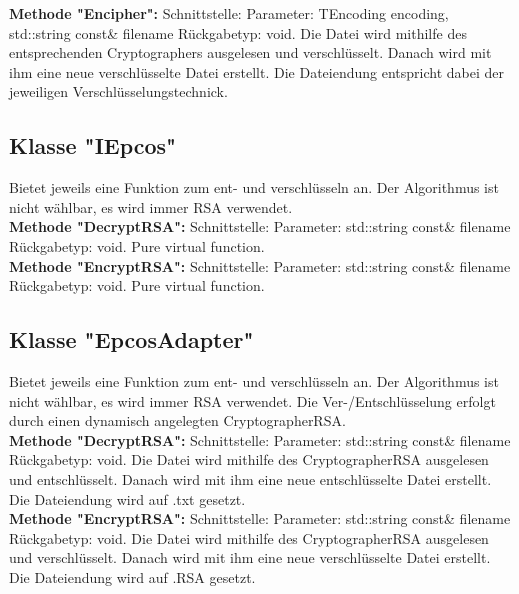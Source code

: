 \documentclass[12pt,a4paper]{article}
\begin{document}
\textbf {Methode "Encipher": } 
\newline
Schnittstelle:
Parameter: TEncoding encoding, std::string const\& filename
Rückgabetyp: void.
\newline
Die Datei wird mithilfe des entsprechenden Cryptographers ausgelesen und verschlüsselt. Danach wird mit ihm eine neue verschlüsselte Datei erstellt. Die Dateiendung entspricht dabei der jeweiligen Verschlüsselungstechnick.
\\


\subsection {Klasse "IEpcos"}
Bietet jeweils eine Funktion zum ent- und verschlüsseln an. Der Algorithmus ist nicht wählbar, es wird immer RSA verwendet.
\\

\textbf {Methode "DecryptRSA": } 
\newline
Schnittstelle:
Parameter: std::string const\& filename
Rückgabetyp: void.
\newline
Pure virtual function.
\\

\textbf {Methode "EncryptRSA": } 
\newline
Schnittstelle:
Parameter: std::string const\& filename
Rückgabetyp: void.
\newline
Pure virtual function.
\\


\subsection {Klasse "EpcosAdapter"}
Bietet jeweils eine Funktion zum ent- und verschlüsseln an. Der Algorithmus ist nicht wählbar, es wird immer RSA verwendet. Die Ver-/Entschlüsselung erfolgt durch einen dynamisch angelegten CryptographerRSA.
\\

\textbf {Methode "DecryptRSA": } 
\newline
Schnittstelle:
Parameter: std::string const\& filename
Rückgabetyp: void.
\newline
Die Datei wird mithilfe des CryptographerRSA ausgelesen und entschlüsselt. Danach wird mit ihm eine neue entschlüsselte Datei erstellt. Die Dateiendung wird auf .txt gesetzt.
\\

\textbf {Methode "EncryptRSA": } 
\newline
Schnittstelle:
Parameter: std::string const\& filename
Rückgabetyp: void.
\newline
Die Datei wird mithilfe des CryptographerRSA ausgelesen und verschlüsselt. Danach wird mit ihm eine neue verschlüsselte Datei erstellt. Die Dateiendung wird auf .RSA gesetzt.
\\
\end{document}
